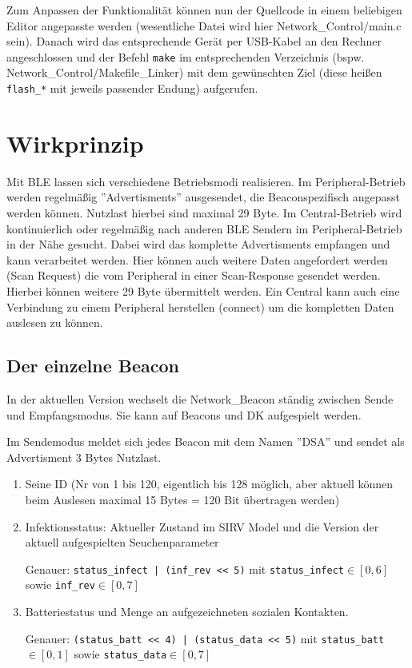 \documentclass[11pt,ngerman]{scrartcl} %
\begin{document}
Zum Anpassen der Funktionalität können nun der Quellcode in einem beliebigen Editor angepasste werden (wesentliche Datei wird hier Network\_Control/main.c sein). Danach wird das entsprechende Gerät per USB-Kabel an den Rechner angeschlossen und der Befehl \verb|make| im entsprechenden Verzeichnis (bspw. Network\_Control/Makefile\_Linker) mit dem gewünschten Ziel (diese heißen \verb|flash_*| mit jeweils passender Endung) aufgerufen.

\section{Wirkprinzip}
Mit BLE lassen sich verschiedene Betriebsmodi realisieren. Im Peripheral-Betrieb werden regelmäßig ''Advertisments'' ausgesendet, die Beaconspezifisch angepasst werden können. Nutzlast hierbei sind maximal 29 Byte. Im Central-Betrieb wird kontinuierlich oder regelmäßig nach anderen BLE Sendern im Peripheral-Betrieb in der Nähe gesucht. Dabei wird das komplette Advertisments empfangen und kann verarbeitet werden. Hier können auch weitere Daten angefordert werden (Scan Request) die vom Peripheral in einer Scan-Response gesendet werden. Hierbei können weitere 29 Byte übermittelt werden. Ein Central kann auch eine Verbindung zu einem Peripheral herstellen  (connect) um die kompletten Daten auslesen zu können.


\subsection{Der einzelne Beacon}

In der aktuellen Version wechselt die Network\_Beacon ständig zwischen Sende und Empfangsmodus. Sie kann auf Beacons und DK aufgespielt werden.

Im Sendemodus  meldet sich jedes Beacon mit dem Namen ''DSA'' und sendet als Advertisment 3 Bytes Nutzlast. 
\begin{enumerate}
\item Seine ID (Nr von 1 bis 120, eigentlich bis 128 möglich, aber aktuell können beim Auslesen maximal 15 Bytes = 120 Bit übertragen werden)
\item Infektionsstatus: Aktueller Zustand im SIRV Model und die Version der aktuell aufgespielten Seuchenparameter

  Genauer: \verb!status_infect | (inf_rev << 5)! mit \verb!status_infect!$\in [0,6]$ sowie \verb!inf_rev!$\in [0,7]$
\item Batteriestatus und Menge an aufgezeichneten sozialen Kontakten.

  Genauer: \verb!(status_batt << 4) | (status_data << 5)! mit \verb!status_batt!$\in [0,1]$ sowie \verb!status_data!$\in [0,7]$
\end{enumerate}
\end{document}
